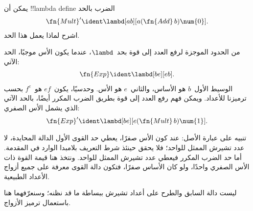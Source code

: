 \documentclass[../../../include/open-logic-section]{subfiles}
\begin{document}
\begin{prob}
يمكن أن !!{lambda define} الضرب بالحد
\[
  \fn{Mult}' \ident \lambd[ab][a (\fn{Add}\, b) \num{0}].
\]
اشرح لماذا يعمل هذا الحد.
\end{prob}

من الحدود الموجزة لرفع العدد إلى قوة بحد~$\lambd$، عندما يكون الأس موجبًا، الحد الآتي:
\[
  \fn{Exp} \ident \lambd[be][e b].
\]
الوسيط الأول~$b$ هو الأساس، والثاني~$e$ هو الأس. وحدسيًا، يكون~$e f$
هو~$f^e$ بحسب ترميزنا للأعداد. ويمكن فهم رفع العدد إلى قوة بطريق
الضرب المكرر أيضًا، بالحد الآتي الذي يشمل الأس الصفري:
\[
  \fn{Exp}' \ident \lambd[be][e (\fn{Mult}\, b) \num{1}].
\]

تنبيه على عبارة الأصل: عند كون الأس صفرًا، يعطي حد القوى الأول الدالة
المحايدة، لا عدد تشيرش الممثل للواحد؛ فلا يحقق حينئذ شرط التعريف
بلامبدا الوارد في المقدمة. أما حد الضرب المكرر فيعطي عدد تشيرش
الممثل للواحد. ونتخذ هنا قيمة القوة ذات الأس الصفري واحدًا، ولو كان
الأساس صفرًا، فتكون دالة القوى معرفة على جميع أزواج الأعداد الطبيعية.

ليست دالة السابق والطرح على أعداد تشيرش ببساطة ما قد نظنه؛
وسنعرّفهما هنا باستعمال ترميز الأزواج.
\end{document}
